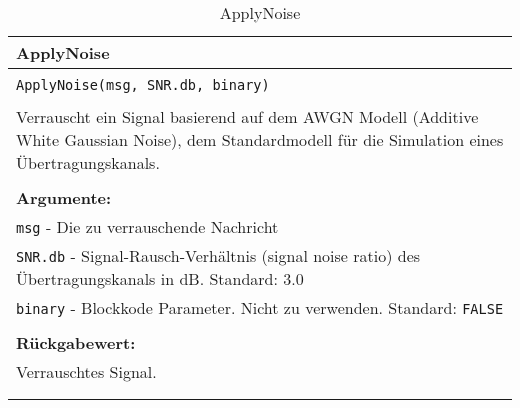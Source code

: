 \begin{longtable}{|p{\textwidth}|}
\hline
\rowcolor{lightblue}
ApplyNoise
\\
\hline
\\
\texttt{ApplyNoise(msg, SNR.db, binary)}\\
\\
Verrauscht ein Signal basierend auf dem AWGN Modell (Additive White Gaussian Noise), dem Standardmodell für die Simulation eines Übertragungskanals.\\
\\
\textbf{Argumente:}\\
\texttt{msg} - Die zu verrauschende Nachricht\\
\texttt{SNR.db} - Signal-Rausch-Verhältnis (signal noise ratio) des Übertragungskanals in dB. Standard: 3.0\\
\texttt{binary} - Blockkode Parameter. Nicht zu verwenden. Standard: \texttt{FALSE}\\
\\
\textbf{Rückgabewert:}\\
Verrauschtes Signal.\\
\\
\hline
\caption{ApplyNoise}
\end{longtable}